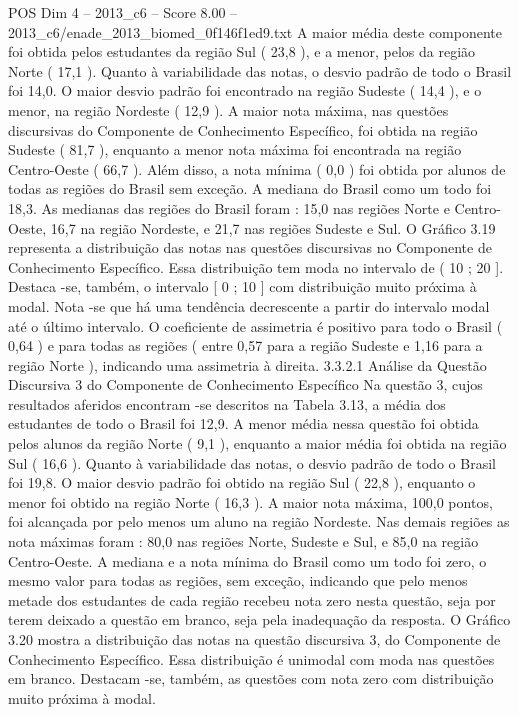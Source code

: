 \begin{textsample}{POS Dim 4 – 2013\_c6 – Score 8.00 – 2013\_c6/enade\_2013\_biomed\_0f146f1ed9.txt}
A maior média deste componente foi obtida pelos estudantes da região Sul ( 23,8 ), e a menor, pelos da região Norte ( 17,1 ).
Quanto à variabilidade das notas, o desvio padrão de todo o Brasil foi 14,0.
O maior desvio padrão foi encontrado na região Sudeste ( 14,4 ), e o menor, na região Nordeste ( 12,9 ).
A maior nota máxima, nas questões discursivas do Componente de Conhecimento Específico, foi obtida na região Sudeste ( 81,7 ), enquanto a menor nota máxima foi encontrada na região Centro-Oeste ( 66,7 ).
Além disso, a nota mínima ( 0,0 ) foi obtida por alunos de todas as regiões do Brasil sem exceção.
A mediana do Brasil como um todo foi 18,3.
As medianas das regiões do Brasil foram : 15,0 nas regiões Norte e Centro-Oeste, 16,7 na região Nordeste, e 21,7 nas regiões Sudeste e Sul.
O Gráfico 3.19 representa a distribuição das notas nas questões discursivas no Componente de Conhecimento Específico.
Essa distribuição tem moda no intervalo de ( 10 ; 20 ].
Destaca -se, também, o intervalo [ 0 ; 10 ] com distribuição muito próxima à modal.
Nota -se que há uma tendência decrescente a partir do intervalo modal até o último intervalo.
O coeficiente de assimetria é positivo para todo o Brasil ( 0,64 ) e para todas as regiões ( entre 0,57 para a região Sudeste e 1,16 para a região Norte ), indicando uma assimetria à direita. 3.3.2.1 Análise da Questão Discursiva 3 do Componente de Conhecimento Específico Na questão 3, cujos resultados aferidos encontram -se descritos na Tabela 3.13, a média dos estudantes de todo o Brasil foi 12,9.
A menor média nessa questão foi obtida pelos alunos da região Norte ( 9,1 ), enquanto a maior média foi obtida na região Sul ( 16,6 ).
Quanto à variabilidade das notas, o desvio padrão de todo o Brasil foi 19,8.
O maior desvio padrão foi obtido na região Sul ( 22,8 ), enquanto o menor foi obtido na região Norte ( 16,3 ).
A maior nota máxima, 100,0 pontos, foi alcançada por pelo menos um aluno na região Nordeste.
Nas demais regiões as nota máximas foram : 80,0 nas regiões Norte, Sudeste e Sul, e 85,0 na região Centro-Oeste.
A mediana e a nota mínima do Brasil como um todo foi zero, o mesmo valor para todas as regiões, sem exceção, indicando que pelo menos metade dos estudantes de cada região recebeu nota zero nesta questão, seja por terem deixado a questão em branco, seja pela inadequação da resposta.
O Gráfico 3.20 mostra a distribuição das notas na questão discursiva 3, do Componente de Conhecimento Específico.
Essa distribuição é unimodal com moda nas questões em branco.
Destacam -se, também, as questões com nota zero com distribuição muito próxima à modal.

\end{textsample}

